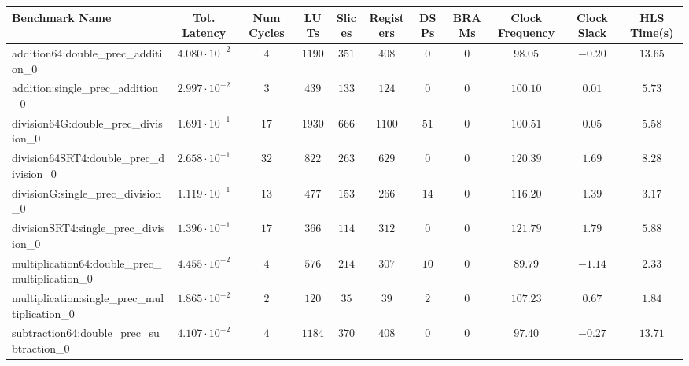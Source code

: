 \begin{tabular}{|l|c|c|c|c|c|c|c|c|c|c|}
\hline
Benchmark Name                                   & Tot. Latency            & Num Cycles & LUTs     & Slices   & Registers & DSPs   & BRAMs & Clock Frequency & Clock Slack & HLS Time(s) \\
\hline
addition64:double\_prec\_addition\_0             & $ 4.080 \cdot 10^{-2} $ & $ 4      $ & $ 1190 $ & $ 351  $ & $ 408   $ & $ 0  $ & $ 0 $ & $ 98.05       $ & $ -0.20   $ & $ 13.65   $ \\
addition:single\_prec\_addition\_0               & $ 2.997 \cdot 10^{-2} $ & $ 3      $ & $ 439  $ & $ 133  $ & $ 124   $ & $ 0  $ & $ 0 $ & $ 100.10      $ & $ 0.01    $ & $ 5.73    $ \\
division64G:double\_prec\_division\_0            & $ 1.691 \cdot 10^{-1} $ & $ 17     $ & $ 1930 $ & $ 666  $ & $ 1100  $ & $ 51 $ & $ 0 $ & $ 100.51      $ & $ 0.05    $ & $ 5.58    $ \\
division64SRT4:double\_prec\_division\_0         & $ 2.658 \cdot 10^{-1} $ & $ 32     $ & $ 822  $ & $ 263  $ & $ 629   $ & $ 0  $ & $ 0 $ & $ 120.39      $ & $ 1.69    $ & $ 8.28    $ \\
divisionG:single\_prec\_division\_0              & $ 1.119 \cdot 10^{-1} $ & $ 13     $ & $ 477  $ & $ 153  $ & $ 266   $ & $ 14 $ & $ 0 $ & $ 116.20      $ & $ 1.39    $ & $ 3.17    $ \\
divisionSRT4:single\_prec\_division\_0           & $ 1.396 \cdot 10^{-1} $ & $ 17     $ & $ 366  $ & $ 114  $ & $ 312   $ & $ 0  $ & $ 0 $ & $ 121.79      $ & $ 1.79    $ & $ 5.88    $ \\
multiplication64:double\_prec\_multiplication\_0 & $ 4.455 \cdot 10^{-2} $ & $ 4      $ & $ 576  $ & $ 214  $ & $ 307   $ & $ 10 $ & $ 0 $ & $ 89.79       $ & $ -1.14   $ & $ 2.33    $ \\
multiplication:single\_prec\_multiplication\_0   & $ 1.865 \cdot 10^{-2} $ & $ 2      $ & $ 120  $ & $ 35   $ & $ 39    $ & $ 2  $ & $ 0 $ & $ 107.23      $ & $ 0.67    $ & $ 1.84    $ \\
subtraction64:double\_prec\_subtraction\_0       & $ 4.107 \cdot 10^{-2} $ & $ 4      $ & $ 1184 $ & $ 370  $ & $ 408   $ & $ 0  $ & $ 0 $ & $ 97.40       $ & $ -0.27   $ & $ 13.71   $ \\

\end{tabular}
